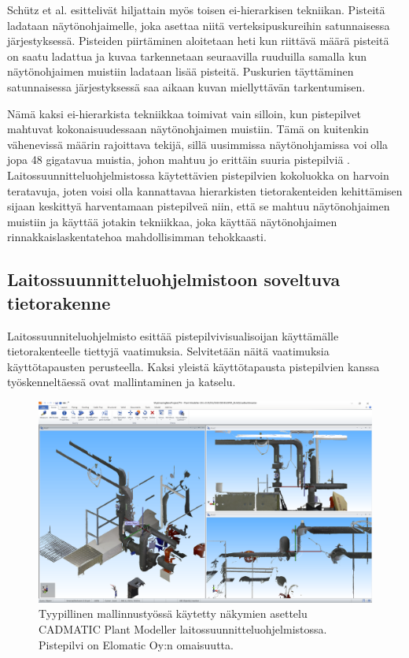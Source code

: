 Schütz et al. esittelivät hiljattain myös toisen ei-hierarkisen tekniikan. Pisteitä ladataan näytönohjaimelle, joka asettaa niitä verteksipuskureihin satunnaisessa järjestyksessä. Pisteiden piirtäminen aloitetaan heti kun riittävä määrä pisteitä on saatu ladattua ja kuvaa tarkennetaan seuraavilla ruuduilla samalla kun näytönohjaimen muistiin ladataan lisää pisteitä. Puskurien täyttäminen satunnaisessa järjestyksessä saa aikaan kuvan miellyttävän tarkentumisen. \cite{progressive}

Nämä kaksi ei-hierarkista tekniikkaa toimivat vain silloin, kun pistepilvet mahtuvat kokonaisuudessaan näytönohjaimen muistiin. Tämä on kuitenkin vähenevissä määrin rajoittava tekijä, sillä uusimmissa näytönohjamissa voi olla jopa 48 gigatavua muistia, johon mahtuu jo erittäin suuria pistepilviä \cite{rtx}. Laitossuunnitteluohjelmistossa käytettävien pistepilvien kokoluokka on harvoin teratavuja, joten voisi olla kannattavaa hierarkisten tietorakenteiden kehittämisen sijaan keskittyä harventamaan pistepilveä niin, että se mahtuu näytönohjaimen muistiin ja käyttää jotakin tekniikkaa, joka käyttää näytönohjaimen rinnakkaislaskentatehoa mahdollisimman tehokkaasti.

\subsection{Laitossuunnitteluohjelmistoon soveltuva tietorakenne}\label{usecase}

Laitossuunniteluohjelmisto esittää pistepilvivisualisoijan käyttämälle tietorakenteelle tiettyjä vaatimuksia. Selvitetään näitä vaatimuksia käyttötapausten perusteella. Kaksi yleistä käyttötapausta pistepilvien kanssa työskenneltäessä ovat mallintaminen ja katselu. 

\begin{figure}
    \centering
    \includegraphics[width=\textwidth]{img/näkymät2.png}
    \caption{Tyypillinen mallinnustyössä käytetty näkymien asettelu CADMATIC Plant Modeller laitossuunnitteluohjelmistossa. Pistepilvi on Elomatic Oy:n omaisuutta.}
    \label{img:views}
\end{figure}

